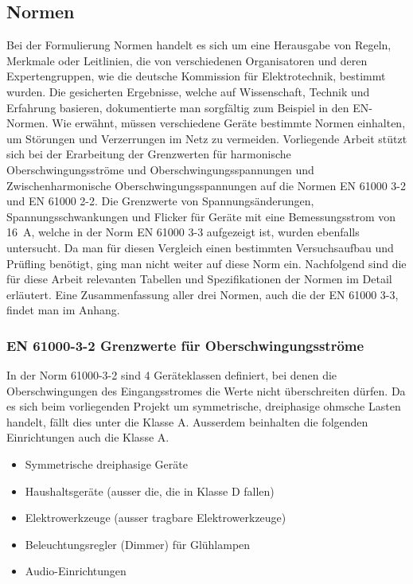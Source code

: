 \subsection{Normen}\label{sec:Normen}
Bei der Formulierung \grqq Normen\grqq \hspace{0.02cm} handelt es sich um eine Herausgabe von Regeln, Merkmale oder Leitlinien, die von verschiedenen Organisatoren und deren Expertengruppen, wie die deutsche Kommission für Elektrotechnik, bestimmt wurden. Die gesicherten Ergebnisse, welche auf Wissenschaft, Technik und Erfahrung basieren, dokumentierte man sorgfältig zum Beispiel in den EN-Normen. Wie erwähnt, müssen verschiedene Geräte bestimmte Normen einhalten, um Störungen und Verzerrungen im Netz zu vermeiden. Vorliegende Arbeit stützt sich bei der Erarbeitung der Grenzwerten für harmonische Oberschwingungsströme und Oberschwingungsspannungen und Zwischenharmonische Oberschwingungsspannungen auf die Normen EN 61000 3-2 und EN 61000 2-2.  Die Grenzwerte von Spannungsänderungen, Spannungsschwankungen und Flicker für Geräte mit eine Bemessungsstrom von \SI{16}{A}, welche in der Norm EN 61000 3-3 aufgezeigt ist, wurden ebenfalls untersucht. Da man für diesen Vergleich einen bestimmten Versuchsaufbau und Prüfling benötigt, ging man nicht weiter auf diese Norm ein. Nachfolgend sind die für diese Arbeit relevanten Tabellen und Spezifikationen der Normen im Detail erläutert. Eine Zusammenfassung aller drei Normen, auch die der EN 61000 3-3, findet man im Anhang.  

\subsubsection{EN 61000-3-2 Grenzwerte für Oberschwingungsströme}\label{sec: Stromnormen}

In der Norm 61000-3-2 sind 4 Geräteklassen definiert, bei denen die Oberschwingungen des Eingangsstromes die Werte nicht überschreiten dürfen. Da es sich beim vorliegenden Projekt um symmetrische, dreiphasige ohmsche Lasten handelt, fällt dies unter die Klasse A. Ausserdem beinhalten die folgenden Einrichtungen auch die Klasse A. 
\begin{itemize}
\item Symmetrische dreiphasige Geräte	
\item Haushaltsgeräte (ausser die, die in Klasse D fallen)
\item Elektrowerkzeuge (ausser tragbare Elektrowerkzeuge)
\item Beleuchtungsregler (Dimmer) für Glühlampen
\item Audio-Einrichtungen
\end{itemize} 

